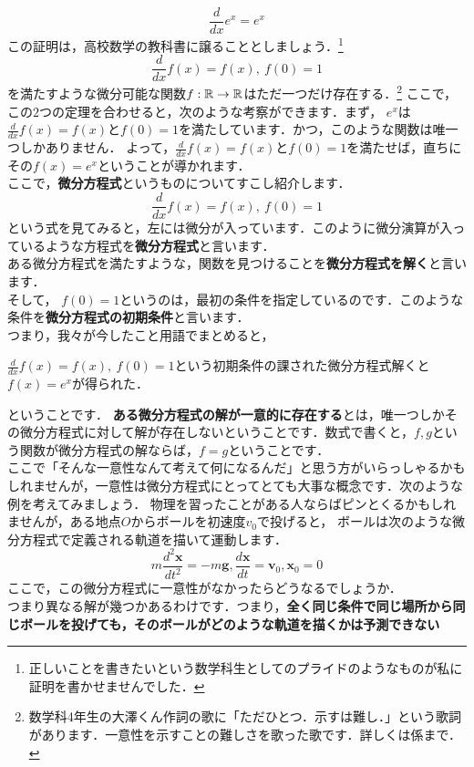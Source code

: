 \thm
\[
\frac{d}{dx} e^x = e^x
\]
\thmx
この証明は，高校数学の教科書に譲ることとしましょう．\footnote{正しいことを書きたいという数学科生としてのプライドのようなものが私に証明を書かせませんでした．}
\thm
\[
\frac{d}{dx} f(x) = f(x) ,\ f(0) = 1
\]
を満たすような微分可能な関数$f:\mathbb R \to \mathbb R$はただ一つだけ存在する．\footnote{数学科4年生の大澤くん作詞の歌に「ただひとつ．示すは難し．」という歌詞があります．一意性を示すことの難しさを歌った歌です．詳しくは係まで．}
\thmx
{}
ここで，この$2$つの定理を合わせると，次のような考察ができます．まず，
$e^x$は$\frac{d}{dx}f(x) = f(x)$と$f(0)=1$を満たしています．かつ，このような関数は唯一つしかありません．
よって，$\frac{d}{dx}f(x) = f(x)$と$f(0)=1$を満たせば，直ちにその$f(x) = e^x$ということが導かれます．\\
ここで，\textbf{微分方程式}というものについてすこし紹介します．\\
\[
\frac{d}{dx} f(x) = f(x) ,\ f(0) = 1
\]
という式を見てみると，左には微分が入っています．このように微分演算が入っているような方程式を\textbf{微分方程式}と言います．\\
ある微分方程式を満たすような，関数を見つけることを\textbf{微分方程式を解く}と言います．\\
そして， $f(0) = 1$というのは，最初の条件を指定しているのです．このような条件を\textbf{微分方程式の初期条件}と言います．\\
つまり，我々が今したこと用語でまとめると，
\begin{center}
$\frac{d}{dx} f(x) = f(x) ,\ f(0) = 1$という初期条件の課された微分方程式解くと$f(x) = e^x$が得られた．
\end{center}ということです．
\textbf{ある微分方程式の解が一意的に存在する}とは，唯一つしかその微分方程式に対して解が存在しないということです．数式で書くと，$f,g$という関数が微分方程式の解ならば，$f=g$ということです．\\
ここで「そんな一意性なんて考えて何になるんだ」と思う方がいらっしゃるかもしれませんが，一意性は微分方程式にとってとても大事な概念です．次のような例を考えてみましょう．
\ex
物理を習ったことがある人ならばピンとくるかもしれませんが，ある地点$O$からボールを初速度$v_0$で投げると，
ボールは次のような微分方程式で定義される軌道を描いて運動します．
\[
m \frac{d^2 \bm{x} }{dt^2}  = -m \bm{g}, \frac{d  \bm{x}}{dt} = \bm{v}_0 , \bm{x}_0 = 0 
\]
ここで，この微分方程式に一意性がなかったらどうなるでしょうか．\\
つまり異なる解が幾つかあるわけです．つまり，\textbf{全く同じ条件で同じ場所から同じボールを投げても，そのボールがどのような軌道を描くかは予測できない}
